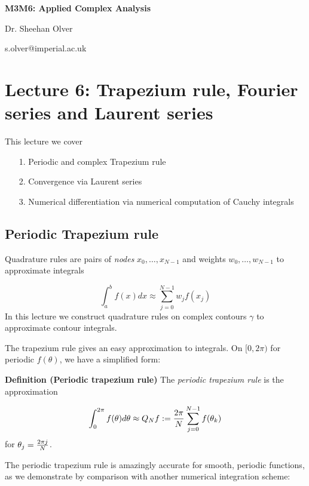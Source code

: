 \documentclass[12pt,a4paper]{article}
\begin{document}
\textbf{M3M6: Applied Complex Analysis}

Dr. Sheehan Olver

s.olver@imperial.ac.uk

\section{Lecture 6: Trapezium rule, Fourier series and Laurent series}
This lecture we cover

\begin{itemize}
\item[1. ] Periodic and complex Trapezium rule    


\item[2. ] Convergence via Laurent series


\item[3. ] Numerical differentiation via numerical computation of Cauchy integrals

\end{itemize}
\subsection{Periodic Trapezium rule}
Quadrature rules are pairs of \emph{nodes} $x_0,\ldots,x_{N-1}$ and weights $w_0,\ldots,w_{N-1}$ to approximate integrals

\[
\int_a^b f(x) dx \approx \sum_{j=0}^{N-1} w_j f(x_j)
\]
In this lecture we construct quadrature rules on complex contours $\gamma$ to approximate contour integrals.

The trapezium rule gives an easy approximation to integrals. On $[0,2\pi)$ for periodic $f(\theta)$, we have a simplified form:

\textbf{Definition (Periodic trapezium rule)} The \emph{periodic trapezium rule} is the approximation

\[
\int_0^{2 \pi} f(\theta) d \theta \approx Q_N f := {2\pi \over N} \sum_{j=0}^{N-1} f(\theta_k)
\]
for $\theta_j = {2 \pi j \over N}$.

The periodic trapezium rule is amazingly accurate for smooth, periodic functions, as we demonstrate by comparison with another numerical integration scheme:
\end{document}
